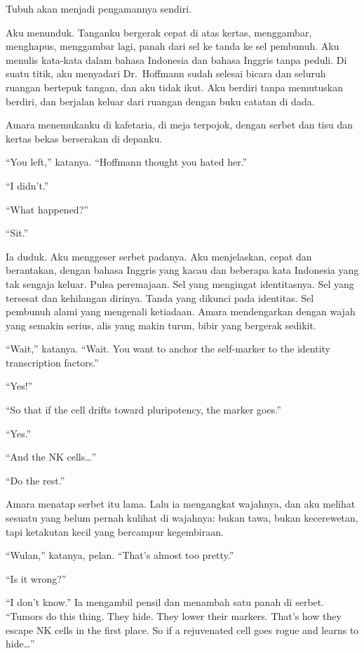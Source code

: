 \documentclass[11pt,twoside,openany]{book}
\makeatletter
\newcommand{\scenebreak}{\par\vspace{0.9em}{\centering\textsc{*\hspace{0.7em}*\hspace{0.7em}*}\par}\vspace{0.9em}\@afterindentfalse\@afterheading}
\makeatother
\begin{document}
Tubuh akan menjadi pengamannya sendiri.

Aku menunduk. Tanganku bergerak cepat di atas kertas, menggambar, menghapus, menggambar lagi, panah dari sel ke tanda ke sel pembunuh. Aku menulis kata-kata dalam bahasa Indonesia dan bahasa Inggris tanpa peduli. Di suatu titik, aku menyadari Dr.~Hoffmann sudah selesai bicara dan seluruh ruangan bertepuk tangan, dan aku tidak ikut. Aku berdiri tanpa memutuskan berdiri, dan berjalan keluar dari ruangan dengan buku catatan di dada.

\scenebreak
Amara menemukanku di kafetaria, di meja terpojok, dengan serbet dan tisu dan kertas bekas berserakan di depanku.

``You left,'' katanya. ``Hoffmann thought you hated her.''

``I didn't.''

``What happened?''

``Sit.''

Ia duduk. Aku menggeser serbet padanya. Aku menjelaskan, cepat dan berantakan, dengan bahasa Inggris yang kacau dan beberapa kata Indonesia yang tak sengaja keluar. Pulsa peremajaan. Sel yang mengingat identitasnya. Sel yang tersesat dan kehilangan dirinya. Tanda yang dikunci pada identitas. Sel pembunuh alami yang mengenali ketiadaan. Amara mendengarkan dengan wajah yang semakin serius, alis yang makin turun, bibir yang bergerak sedikit.

``Wait,'' katanya. ``Wait. You want to anchor the self-marker to the identity transcription factors.''

``Yes!''

``So that if the cell drifts toward pluripotency, the marker goes.''

``Yes.''

``And the NK cells\ldots{}''

``Do the rest.''

Amara menatap serbet itu lama. Lalu ia mengangkat wajahnya, dan aku melihat sesuatu yang belum pernah kulihat di wajahnya: bukan tawa, bukan kecerewetan, tapi ketakutan kecil yang bercampur kegembiraan.

``Wulan,'' katanya, pelan. ``That's almost too pretty.''

``Is it wrong?''

``I don't know.'' Ia mengambil pensil dan menambah satu panah di serbet. ``Tumors do this thing. They hide. They lower their markers. That's how they escape NK cells in the first place. So if a rejuvenated cell goes rogue and learns to hide\ldots{}''
\end{document}
